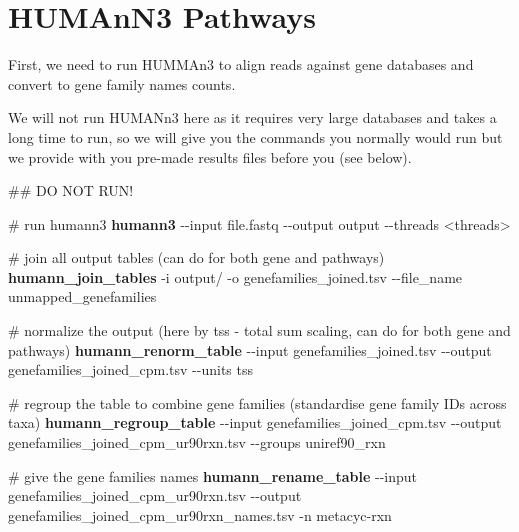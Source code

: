 \documentclass[
  letterpaper,
]{book}
\newenvironment{Shaded}{}{}
\newcommand{\AttributeTok}[1]{\textcolor[rgb]{0.84,0.23,0.29}{#1}}
\newcommand{\CommentTok}[1]{\textcolor[rgb]{0.42,0.45,0.49}{#1}}
\newcommand{\ExtensionTok}[1]{\textcolor[rgb]{0.84,0.23,0.29}{\textbf{#1}}}
\newcommand{\NormalTok}[1]{\textcolor[rgb]{0.14,0.16,0.18}{#1}}
\newcommand{\OperatorTok}[1]{\textcolor[rgb]{0.14,0.16,0.18}{#1}}
\begin{document}
\hypertarget{humann3-pathways}{%
\section{HUMAnN3 Pathways}\label{humann3-pathways}}

First, we need to run HUMMAn3 to align reads against gene databases and
convert to gene family names counts.

\begin{tcolorbox}[enhanced jigsaw, opacitybacktitle=0.6, bottomtitle=1mm, opacityback=0, colback=white, coltitle=black, leftrule=.75mm, toprule=.15mm, title=\textcolor{quarto-callout-warning-color}{\faExclamationTriangle}\hspace{0.5em}{Warning}, colframe=quarto-callout-warning-color-frame, toptitle=1mm, arc=.35mm, left=2mm, titlerule=0mm, breakable, rightrule=.15mm, bottomrule=.15mm, colbacktitle=quarto-callout-warning-color!10!white]

We will not run HUMANn3 here as it requires very large databases and
takes a long time to run, so we will give you the commands you normally
would run but we provide with you pre-made results files before you (see
below).

\begin{Shaded}
\begin{Highlighting}[]
\CommentTok{\#\# DO NOT RUN!}

\CommentTok{\# run humann3}
\ExtensionTok{humann3} \AttributeTok{{-}{-}input}\NormalTok{ file.fastq }\AttributeTok{{-}{-}output}\NormalTok{ output }\AttributeTok{{-}{-}threads} \OperatorTok{\textless{}}\NormalTok{threads}\OperatorTok{\textgreater{}}

\CommentTok{\# join all output tables (can do for both gene and pathways)}
\ExtensionTok{humann\_join\_tables} \AttributeTok{{-}i}\NormalTok{ output/ }\AttributeTok{{-}o}\NormalTok{ genefamilies\_joined.tsv }\AttributeTok{{-}{-}file\_name}\NormalTok{ unmapped\_genefamilies}

\CommentTok{\# normalize the output (here by tss {-} total sum scaling, can do for both gene and pathways)}
\ExtensionTok{humann\_renorm\_table} \AttributeTok{{-}{-}input}\NormalTok{ genefamilies\_joined.tsv }\AttributeTok{{-}{-}output}\NormalTok{ genefamilies\_joined\_cpm.tsv }\AttributeTok{{-}{-}units}\NormalTok{ tss}

\CommentTok{\# regroup the table to combine gene families (standardise gene family IDs across taxa)}
\ExtensionTok{humann\_regroup\_table} \AttributeTok{{-}{-}input}\NormalTok{ genefamilies\_joined\_cpm.tsv }\AttributeTok{{-}{-}output}\NormalTok{ genefamilies\_joined\_cpm\_ur90rxn.tsv }\AttributeTok{{-}{-}groups}\NormalTok{ uniref90\_rxn}

\CommentTok{\# give the gene families names}
\ExtensionTok{humann\_rename\_table} \AttributeTok{{-}{-}input}\NormalTok{ genefamilies\_joined\_cpm\_ur90rxn.tsv }\AttributeTok{{-}{-}output}\NormalTok{ genefamilies\_joined\_cpm\_ur90rxn\_names.tsv }\AttributeTok{{-}n}\NormalTok{ metacyc{-}rxn}
\end{Highlighting}
\end{Shaded}

\end{tcolorbox}
\end{document}
